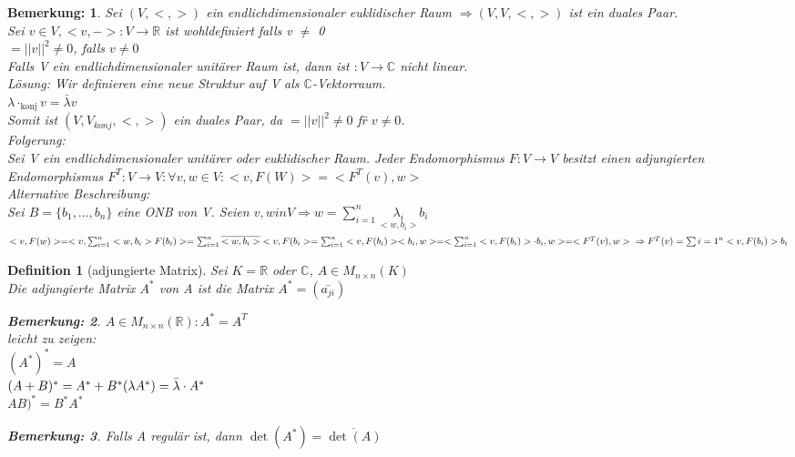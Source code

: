 \documentclass{report}
\newcommand{\lb}{\lambda}
\newcommand{\R}{\mathbb{R}}
\newcommand{\C}{\mathbb{C}}
\theoremstyle{customrem}
\newtheorem*{bemerkung}{Bemerkung\textnormal:}
\theoremstyle{customdef}
\newtheorem{definition}{Definition}[chapter]
\theoremstyle{customenv}
\begin{document}
\begin{bemerkung}
  Sei \((V, <, >)\) ein endlichdimensionaler euklidischer Raum
  \(\Rightarrow (V, V, <, >)\) ist ein duales Paar.\\
  Sei \(v \in V, <v, ->: V \to \R\) ist wohldefiniert falls v \(\neq\) 0\\
  \(<,v, v> = ||v||^2 \neq 0\), falls \(v \neq 0\)\\
  Falls V ein endlichdimensionaler unit\"arer Raum ist, dann ist
  \(<, -> : V \to \C\) nicht linear.\\
  L\"osung: Wir definieren eine neue Struktur auf V als \(\C\)-Vektorraum.\\
  \(\lb \cdot_{\text{konj}} v = \bar{\lb} v\)\\
  Somit ist \((V, V_{konj}, <, >)\) ein duales Paar, da
  \(<v, v> = ||v||^2 \neq 0\) f\"r \(v \neq 0\).\\
  Folgerung:\\
  Sei V ein endlichdimensionaler unit\"arer oder euklidischer Raum. 
  Jeder Endomorphismus \(F : V \to V\) besitzt einen adjungierten Endomorphismus
  \(F^T : V \to V : \forall v, w \in V : <v, F(W)> = <F^T(v), w>\)\\
  Alternative Beschreibung:\\
  Sei \(B = \{b_1, \dots, b_n\}\) eine ONB von V. Seien
  \(v, w in V \Rightarrow w = \sum_{i=1}^n \underset{<w, b_i>}{\lb_i} b_i\)\\
  \(<v, F(w)>
  = <v, \sum_{i=1}^n <w, b_i> F(b_i)>
  = \sum_{i=1}^n \overline{<w, b_i>}<v, F(b_i> 
  = \sum_{i=1}^n <v, F(b_i)><b_i, w>
  = <\sum_{i=1}^n<v, F(b_i)> \cdot b_i, w>
  = <F^T(v), w>\\
  \Rightarrow F^T(v) = \sum{i=1}^n <v, F(b_i)> b_i\)
\end{bemerkung}

\begin{definition}[adjungierte Matrix]
  Sei \(K = \R\) oder \(\C\), \(A \in M_{n \times n}(K)\)\\
  Die adjungierte Matrix \(A^*\) von A ist die Matrix \(A^* = (\bar{a_{ji}})\)
  \begin{bemerkung}
    \(A \in M_{n \times n}(\R) : A^* = A^T\)\\
    leicht zu zeigen:\\
    \((A^*)^* = A\)\\
    \((A + B)^* = A^* + B^*\\
    (\lb A^*) = \bar\lb \cdot A^*\)\\
    \(A B)^* = B^* A^*\)
  \end{bemerkung}
  \begin{bemerkung}
    Falls A regul\"ar ist, dann \(\det(A^*) = \overline{\det(A)}\)
  \end{bemerkung}
\end{definition}
\end{document}
